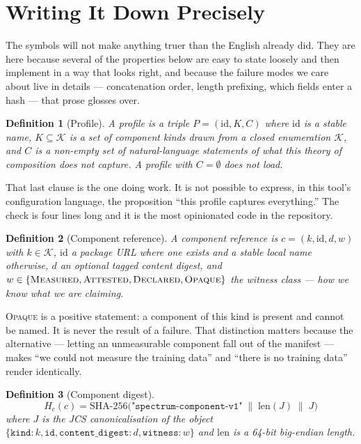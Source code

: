 \documentclass[11pt]{article}
\newtheorem{definition}{Definition}
\begin{document}
\section{Writing It Down Precisely}
\label{sec:precise}

The symbols will not make anything truer than the English already did. They
are here because several of the properties below are easy to state loosely and
then implement in a way that looks right, and because the failure modes we
care about live in details --- concatenation order, length prefixing, which
fields enter a hash --- that prose glosses over.

\begin{definition}[Profile]
A profile is a triple $P = (\mathrm{id}, K, C)$ where $\mathrm{id}$ is a
stable name, $K \subseteq \mathcal{K}$ is a set of component kinds drawn from
a closed enumeration $\mathcal{K}$, and $C$ is a non-empty set of
natural-language statements of what this theory of composition does not
capture. A profile with $C = \emptyset$ does not load.
\end{definition}

That last clause is the one doing work. It is not possible to express, in this
tool's configuration language, the proposition ``this profile captures
everything.'' The check is four lines long and it is the most opinionated code
in the repository.

\begin{definition}[Component reference]
A component reference is $c = (k, \mathrm{id}, d, w)$ with $k \in
\mathcal{K}$, $\mathrm{id}$ a package URL where one exists and a stable local
name otherwise, $d$ an optional tagged content digest, and $w \in
\{\textsc{Measured}, \textsc{Attested}, \textsc{Declared}, \textsc{Opaque}\}$
the witness class --- how we know what we are claiming.
\end{definition}

\textsc{Opaque} is a positive statement: a component of this kind is present
and cannot be named. It is never the result of a failure. That distinction
matters because the alternative --- letting an unmeasurable component fall out
of the manifest --- makes ``we could not measure the training data'' and
``there is no training data'' render identically.

\begin{definition}[Component digest]
\[
  H_c(c) = \mathrm{SHA\text{-}256}\big(\texttt{"spectrum-component-v1"}
  \;\|\; \mathrm{len}(J) \;\|\; J \big)
\]
where $J$ is the JCS canonicalisation of the object
$\{\texttt{kind}: k, \texttt{id}, \texttt{content\_digest}: d,
\texttt{witness}: w\}$ and $\mathrm{len}$ is a 64-bit big-endian length.
\end{definition}
\end{document}
